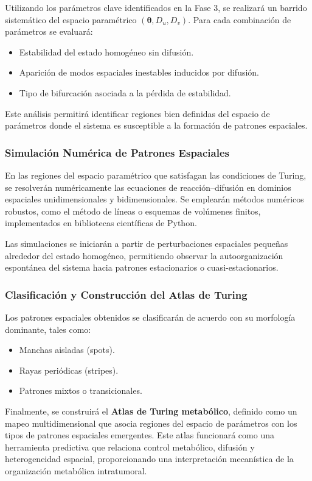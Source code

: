 \documentclass[12pt,spanish]{article}
\begin{document}
	Utilizando los parámetros clave identificados en la Fase 3, se realizará un barrido sistemático del espacio paramétrico $(\boldsymbol{\theta}, D_u, D_v)$. Para cada combinación de parámetros se evaluará:
	\begin{itemize}
		\item Estabilidad del estado homogéneo sin difusión.
		\item Aparición de modos espaciales inestables inducidos por difusión.
		\item Tipo de bifurcación asociada a la pérdida de estabilidad.
	\end{itemize}
	
	Este análisis permitirá identificar regiones bien definidas del espacio de parámetros donde el sistema es susceptible a la formación de patrones espaciales.
	
	\subsubsection*{Simulación Numérica de Patrones Espaciales}
	
	En las regiones del espacio paramétrico que satisfagan las condiciones de Turing, se resolverán numéricamente las ecuaciones de reacción--difusión en dominios espaciales unidimensionales y bidimensionales. Se emplearán métodos numéricos robustos, como el método de líneas o esquemas de volúmenes finitos, implementados en bibliotecas científicas de Python.
	
	Las simulaciones se iniciarán a partir de perturbaciones espaciales pequeñas alrededor del estado homogéneo, permitiendo observar la autoorganización espontánea del sistema hacia patrones estacionarios o cuasi-estacionarios.
	
	\subsubsection*{Clasificación y Construcción del Atlas de Turing}
	
	Los patrones espaciales obtenidos se clasificarán de acuerdo con su morfología dominante, tales como:
	\begin{itemize}
		\item Manchas aisladas (spots).
		\item Rayas periódicas (stripes).
		\item Patrones mixtos o transicionales.
	\end{itemize}
	
	Finalmente, se construirá el \textbf{Atlas de Turing metabólico}, definido como un mapeo multidimensional que asocia regiones del espacio de parámetros con los tipos de patrones espaciales emergentes. Este atlas funcionará como una herramienta predictiva que relaciona control metabólico, difusión y heterogeneidad espacial, proporcionando una interpretación mecanística de la organización metabólica intratumoral.
	
\end{document}

